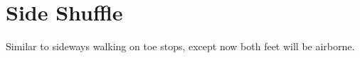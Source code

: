 \section{Side Shuffle}
\label{sec:toe_stop/side_shuffle}

Similar to sideways walking on toe stops, except now both feet will be airborne.  

